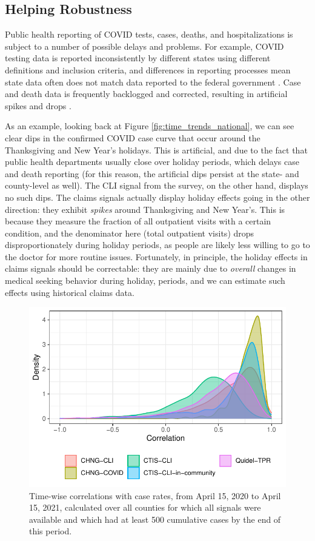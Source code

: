 \documentclass[9pt,twocolumn,twoside,lineno]{pnas-new}
\begin{document}
\subsection{Helping Robustness}

Public health reporting of COVID tests, cases, deaths, and hospitalizations is
subject to a number of possible delays and problems. For example, COVID testing
data is reported inconsistently by different states using different definitions
and inclusion criteria, and differences in reporting processes mean state data
often does not match data reported to the federal government
\cite{Schechtman:2021}. Case and death data is frequently backlogged and
corrected, resulting in artificial spikes and drops \cite{Simon:2021,
  ArvisaisAnhalt:2021}.

As an example, looking back at Figure \ref{fig:time_trends_national}, we can see
clear dips in the confirmed COVID case curve that occur around the Thanksgiving
and New Year's holidays. This is artificial, and due to the fact that public
health departments usually close over holiday periods, which delays case and
death reporting (for this reason, the artificial dips persist at the state- and
county-level as well). The CLI signal from the survey, on the other hand,
displays no such dips. The claims signals actually display holiday effects going
in the other direction: they exhibit \textit{spikes} around Thanksgiving and New
Year's. This is because they measure the fraction of all outpatient visits with
a certain condition, and the denominator here (total outpatient visits) drops
disproportionately during holiday periods, as people are likely less willing to
go to the doctor for more routine issues. Fortunately, in principle, the holiday
effects in claims signals should be correctable: they are mainly due to
\textit{overall} changes in medical seeking behavior during holiday, periods,
and we can estimate such effects using historical claims data.

\begin{figure}[t]
  \includegraphics[width=\columnwidth]{fig/time_wise_correlation.pdf}
  \caption{Time-wise correlations with case rates, from April 15, 2020 to April
    15, 2021, calculated over all counties for which all signals were available
    and which had at least 500 cumulative cases by the end of this period.}
  \label{fig:time_wise_correlation}
\end{figure}
\end{document}

